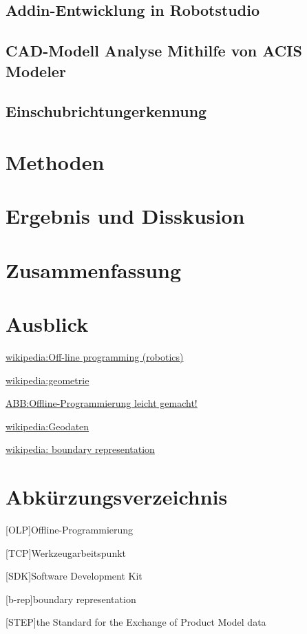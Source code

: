 \documentclass[14pt,a4paper,titlepage]{article}
\begin{document}
	\subsection{Addin-Entwicklung in Robotstudio}
	\subsection{CAD-Modell Analyse Mithilfe von ACIS Modeler}
	\subsection{Einschubrichtungerkennung}
	\section{Methoden}
	\section{Ergebnis und Disskusion}
	\section{Zusammenfassung}
	\section{Ausblick}
	\pagebreak
	\begin{thebibliography}{1}
		\href{https://en.wikipedia.org/wiki/Off-line_programming_(robotics)}{wikipedia:Off-line programming (robotics)}
		
		\href{https://de.wikipedia.org/wiki/Geometrie}{wikipedia:geometrie}
		
		\href{https://new.abb.com/products/robotics/de/robotstudio}{ABB:Offline-Programmierung leicht gemacht!}
		
		\href{https://de.wikipedia.org/wiki/Geodaten#Topologie}{wikipedia:Geodaten}
		
		\href{https://en.wikipedia.org/wiki/Boundary_representation}{wikipedia: boundary representation}
	\end{thebibliography}
	\pagebreak
	\listoffigures
	\pagebreak
	\section*{Abkürzungsverzeichnis}
	\begin{acronym}[OLP]
		[OLP]{Offline-Programmierung}
	\end{acronym}
	\begin{acronym}[TCP]
		[TCP]{Werkzeugarbeitspunkt}
	\end{acronym}
	\begin{acronym}[SDK]
		[SDK]{Software Development Kit}
	\end{acronym}
	\begin{acronym}[b-rep]
		[b-rep]{boundary representation}
	\end{acronym}
	\begin{acronym}[step]
		{the Standard for the Exchange of Product Model data}
	\end{acronym}
\end{document}
